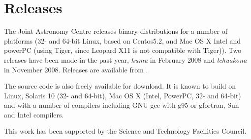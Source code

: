 \documentclass[11pt,twoside]{article}  %
\begin{document}
\section{Releases}

The Joint Astronomy Centre releases binary distributions for a number of platforms (32- and 64-bit Linux, based on Centos5.2, and Mac OS X Intel and powerPC (using Tiger, since Leopard X11 is not compatible with Tiger)). Two releases have been made in the past year, \textit{humu} in February 2008 and \textit{lehuakona} in November 2008. Releases are available from .

The source code is also freely available for download. It is known to build on Linux, Solaris 10 (32- and 64-bit), Mac OS X (Intel, PowerPC, 32- and 64-bit) and with a number of compilers  including GNU gcc with g95 or gfortran,  Sun and Intel compilers.



\acknowledgments

This work has been supported by the Science and Technology Facilities Council.

%
%
%
\end{document}
